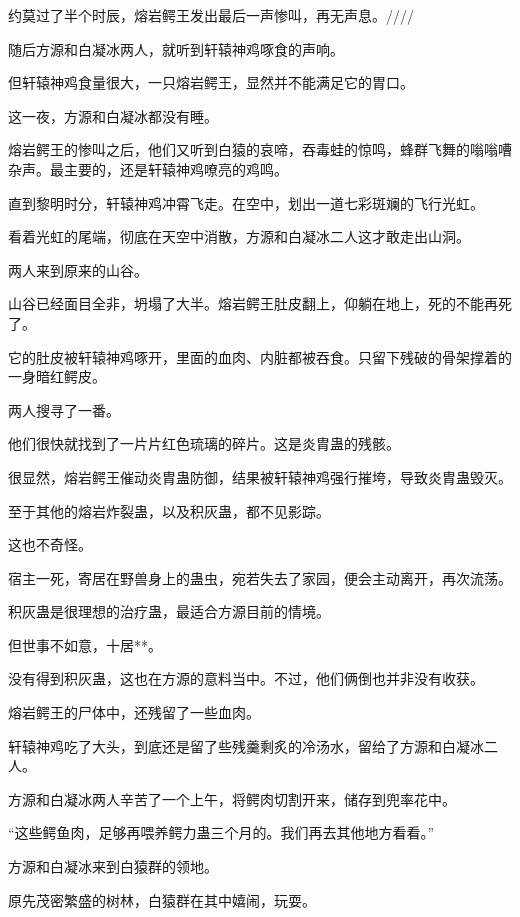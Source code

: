 
\begin{this_body}

约莫过了半个时辰，熔岩鳄王发出最后一声惨叫，再无声息。////

随后方源和白凝冰两人，就听到轩辕神鸡啄食的声响。

但轩辕神鸡食量很大，一只熔岩鳄王，显然并不能满足它的胃口。

这一夜，方源和白凝冰都没有睡。

熔岩鳄王的惨叫之后，他们又听到白猿的哀啼，吞毒蛙的惊鸣，蜂群飞舞的嗡嗡嘈杂声。最主要的，还是轩辕神鸡嘹亮的鸡鸣。

直到黎明时分，轩辕神鸡冲霄飞走。在空中，划出一道七彩斑斓的飞行光虹。

看着光虹的尾端，彻底在天空中消散，方源和白凝冰二人这才敢走出山洞。

两人来到原来的山谷。

山谷已经面目全非，坍塌了大半。熔岩鳄王肚皮翻上，仰躺在地上，死的不能再死了。

它的肚皮被轩辕神鸡啄开，里面的血肉、内脏都被吞食。只留下残破的骨架撑着的一身暗红鳄皮。

两人搜寻了一番。

他们很快就找到了一片片红色琉璃的碎片。这是炎胄蛊的残骸。

很显然，熔岩鳄王催动炎胄蛊防御，结果被轩辕神鸡强行摧垮，导致炎胄蛊毁灭。

至于其他的熔岩炸裂蛊，以及积灰蛊，都不见影踪。

这也不奇怪。

宿主一死，寄居在野兽身上的蛊虫，宛若失去了家园，便会主动离开，再次流荡。

积灰蛊是很理想的治疗蛊，最适合方源目前的情境。

但世事不如意，十居**。

没有得到积灰蛊，这也在方源的意料当中。不过，他们俩倒也并非没有收获。

熔岩鳄王的尸体中，还残留了一些血肉。

轩辕神鸡吃了大头，到底还是留了些残羹剩炙的冷汤水，留给了方源和白凝冰二人。

方源和白凝冰两人辛苦了一个上午，将鳄肉切割开来，储存到兜率花中。

“这些鳄鱼肉，足够再喂养鳄力蛊三个月的。我们再去其他地方看看。”

方源和白凝冰来到白猿群的领地。

原先茂密繁盛的树林，白猿群在其中嬉闹，玩耍。


\end{this_body}
